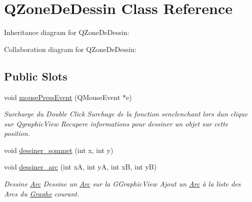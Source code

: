 \hypertarget{classQZoneDeDessin}{}\section{Q\+Zone\+De\+Dessin Class Reference}
\label{classQZoneDeDessin}


Inheritance diagram for Q\+Zone\+De\+Dessin\+:


Collaboration diagram for Q\+Zone\+De\+Dessin\+:
\subsection*{Public Slots}
\begin{DoxyCompactItemize}
\item 
void \hyperlink{classQZoneDeDessin_a9a01279140824f3d2fe79c0617224d18}{mouse\+Press\+Event} (Q\+Mouse\+Event $\ast$e)
\begin{DoxyCompactList}\small\item\em Surcharge du Double Click Surchage de la fonction s\textquotesingle{}enclenchant lors d\textquotesingle{}un clique sur Qgraphic\+View Recupere informations pour dessiner un objet sur cette position. \end{DoxyCompactList}\item 
void \hyperlink{classQZoneDeDessin_a662f14f1e9f05ad5ceb0d5aaceaabe8e}{dessiner\+\_\+sommet} (int x, int y)
\item 
void \hyperlink{classQZoneDeDessin_a6cb201a39b3c7a12dfb5cd39bc3e8063}{dessiner\+\_\+arc} (int xA, int yA, int xB, int yB)
\begin{DoxyCompactList}\small\item\em Dessine \hyperlink{classArc}{Arc} Dessine un \hyperlink{classArc}{Arc} sur la G\+Graphic\+View Ajout un \hyperlink{classArc}{Arc} \`{a} la liste des Arcs du \hyperlink{classGraphe}{Graphe} courant. \end{DoxyCompactList}\end{DoxyCompactItemize}
